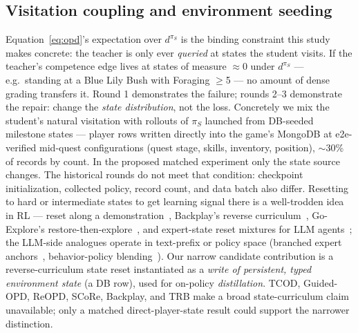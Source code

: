 \documentclass[11pt]{article}
\begin{document}
\subsection{Visitation coupling and environment seeding}
\label{sec:visitation}
Equation~\ref{eq:opd}'s expectation over $d^{\pi_S}$ is the binding constraint this study makes
concrete: the teacher is only ever \emph{queried} at states the student visits. If the teacher's
competence edge lives at states of measure $\approx 0$ under $d^{\pi_S}$ --- e.g.\ standing at a
Blue Lily Bush with Foraging $\ge$5 --- no amount of dense grading transfers it. Round 1
demonstrates the failure; rounds 2--3 demonstrate the repair: change the \emph{state
distribution}, not the loss. Concretely we mix the student's natural visitation with rollouts of
$\pi_S$ launched from DB-seeded milestone states --- player rows written directly into the game's
MongoDB at e2e-verified mid-quest configurations (quest stage, skills, inventory, position),
$\sim$30\% of records by count. In the proposed matched experiment only the state source changes.
The historical rounds do not meet that condition: checkpoint initialization, collected policy,
record count, and data batch also differ. Resetting to hard or intermediate states to get learning signal there is a
well-trodden idea in RL --- reset along a demonstration~\cite{salchen}, Backplay's reverse
curriculum~\cite{backplay}, Go-Explore's restore-then-explore~\cite{goexplore}, and expert-state
reset mixtures for LLM agents~\cite{reset5050}; the LLM-side analogues operate in text-prefix or
policy space (branched expert anchors~\cite{bread}, behavior-policy blending~\cite{trb}). Our
narrow candidate contribution is a reverse-curriculum state reset
instantiated as a \emph{write of persistent, typed environment state} (a DB row), used for
on-policy \emph{distillation}. TCOD, Guided-OPD, ReOPD, SCoRe, Backplay, and TRB make a broad
state-curriculum claim unavailable; only a matched direct-player-state result could support the
narrower distinction.
\end{document}
